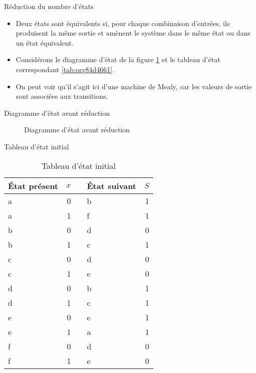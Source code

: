\documentclass[presentation]{beamer}
\begin{document}
\begin{frame}[label={sec:org2940263}]{Réduction du nombre d'états}
\begin{itemize}
\item Deux états sont équivalents si, pour chaque combinaison d'entrées, ils produisent la même sortie et amènent le système dans le même état ou dans un état équivalent.

\item Considérons le diagramme d'état de la figure \ref{fig:org5f3d481} et le tableau d'état correspondant \ref{tab:org84d4661}.

\item On peut voir qu'il s'agit ici d'une machine de Mealy, car les valeurs de sortie sont associées aux transitions.
\end{itemize}
\end{frame}

\begin{frame}[label={sec:org588e4f7}]{Diagramme d'état avant réduction}
\begin{figure}[htbp]
\centering

\caption{\label{fig:org5f3d481}Diagramme d'état avant réduction}
\end{figure}
\end{frame}

\begin{frame}[label={sec:org3666a4e}]{Tableau d'état initial}
\begin{table}[htbp]
\caption{\label{tab:org6144038}Tableau d'état initial}
\centering
\begin{tabular}{lrllr}
État présent & \(x\) &  & État suivant & \(S\)\\[0pt]
\hline
a & 0 &  & b & 1\\[0pt]
a & 1 &  & f & 1\\[0pt]
b & 0 &  & d & 0\\[0pt]
b & 1 &  & c & 1\\[0pt]
c & 0 &  & d & 0\\[0pt]
c & 1 &  & e & 0\\[0pt]
d & 0 &  & b & 1\\[0pt]
d & 1 &  & c & 1\\[0pt]
e & 0 &  & e & 1\\[0pt]
e & 1 &  & a & 1\\[0pt]
f & 0 &  & d & 0\\[0pt]
f & 1 &  & e & 0\\[0pt]
\end{tabular}
\end{table}
\end{frame}
\end{document}
